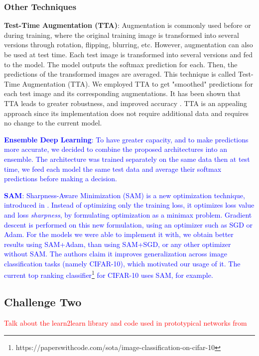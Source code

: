 \documentclass[a4paper,11pt]{article}
\begin{document}
\subsubsection{Other Techniques}
\textbf{Test-Time Augmentation (TTA)}: Augmentation is commonly used before or during training, where the original training image is transformed into several versions through rotation, flipping, blurring, etc. However, augmentation can also be used at test time. Each test image is transformed into several versions and fed to the model. The model outputs the softmax prediction for each. Then, the predictions of the transformed images are averaged. This technique is called Test-Time Augmentation (TTA). We employed TTA to get "smoothed" predictions for each test image and its corresponding augmentations. It has been shown that TTA leads to greater robustness, and improved accuracy \cite{shanmugam2020and}. TTA is an appealing approach since its implementation does not require additional data and requires no change to the current model.

\textcolor{blue}{\textbf{Ensemble Deep Learning}: To have greater capacity, and to make predictions more accurate, we decided to combine the proposed architectures into an ensemble. The architecture was trained separately on the same data then at test time, we feed each model the same test data and average their softmax predictions before making a decision.}

\textcolor{blue}{\textbf{SAM}: Sharpness-Aware Minimization (SAM) is a new optimization technique, introduced in \cite{foret2020sharpnessaware}. Instead of optimizing only the training loss, it optimizes loss value and loss \textit{sharpness}, by formulating optimization as a minimax problem. Gradient descent is performed on this new formulation, using an optimizer such as SGD or Adam. For the models we were able to implement it with, we obtain better results using SAM+Adam, than using SAM+SGD, or any other optimizer without SAM. The authors claim it improves generalization across image classification tasks (namely CIFAR-10), which motivated our usage of it. The current top ranking classifier\footnote{https://paperswithcode.com/sota/image-classification-on-cifar-10} for CIFAR-10 uses SAM, for example.}

\subsection{Challenge Two}
\textcolor{red}{Talk about the learn2learn library and code used in prototypical networks from \cite{Arnold2020-ss} }
\end{document}
